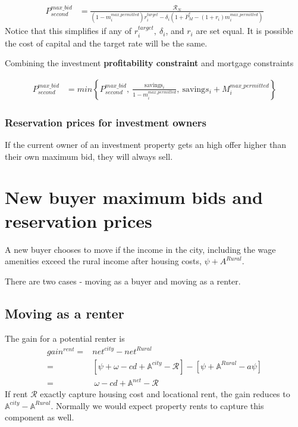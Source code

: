  \begin{eqnarray}\label{eqn-max-second-bid}
P_{second}^{max\_bid} & = \frac{\mathcal{R}_N}{(1-m_i^{max\_permitted})r_i^{target}-\delta_i \left(1 + \dot P_M^e - (1+r_i)m_i^{max\_permitted}\right)} 
\end{eqnarray}
Notice that this simplifies if any of $r_i^{target},\ \delta_i$, and $r_i$ are set equal. It is possible the cost of capital and the target rate will be the same.

Combining the investment \textbf{profitability constraint} and mortgage constraints

\begin{eqnarray}
P_{second}^{max\_bid} & = min \left\{P_{second}^{max\_bid},\ \frac{\mathrm{savings}_i}{1-m_i^{max\_permitted}},\ \mathrm{saving}s_i + M_i^{max\_permitted}  \right\}  \nonumber
\end{eqnarray}

\subsubsection{Reservation prices for investment owners}
If the current owner of an investment  property gets an high offer higher than their own maximum bid, they will always sell.  


\section{New buyer maximum bids and reservation prices }
A new buyer chooses to move if the income in the city, including the wage amenities exceed the rural income after housing costs, $\psi+A^{Rural}$. 

There are two cases - moving as a buyer and moving as a renter.

\subsection{Moving as a renter}
The gain for a potential renter is 
\begin{align}
gain^{rent}=&net^{city}-net^{Rural}\nonumber\\
=&\left[\psi+\omega-cd+\mathbb{A}^{city}-\mathcal{R}\right]-\left[\psi+\mathbb{A}^{Rural}-a\psi\right] \nonumber\\
=&\ \omega-cd+\mathbb{A}^{net}-\mathcal{R}
\label{eq-move-to-rent}
\end{align}
If rent $\mathcal{R}$ exactly capture housing cost and locational rent, the gain reduces to $\mathbb{A}^{city}-\mathbb{A}^{Rural}$. Normally we would expect property rents to capture this component  as well. 

